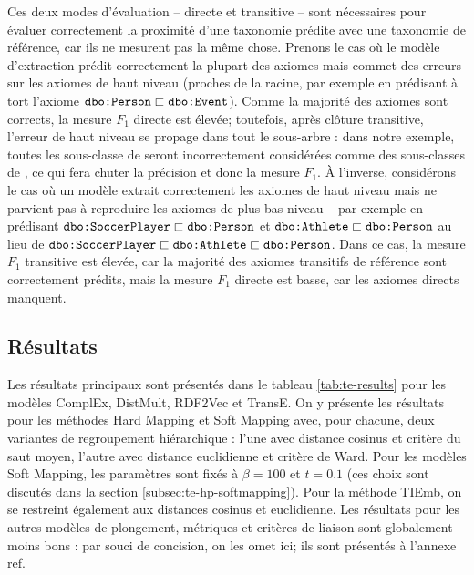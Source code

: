 Ces deux modes d'évaluation – directe et transitive – sont nécessaires pour évaluer correctement la proximité d'une taxonomie prédite avec une taxonomie de référence, car ils ne mesurent pas la même chose. Prenons le cas où le modèle d'extraction prédit correctement la plupart des axiomes mais commet des erreurs sur les axiomes de haut niveau (proches de la racine, par exemple en prédisant à tort l'axiome $\texttt{dbo:Person} \sqsubset \texttt{dbo:Event}$). Comme la majorité des axiomes sont corrects, la mesure $F_1$ directe est élevée; toutefois, après clôture transitive, l'erreur de haut niveau se propage dans tout le sous-arbre : dans notre exemple, toutes les sous-classe de  seront incorrectement considérées comme des sous-classes de , ce qui fera chuter la précision et donc la mesure $F_1$. À l'inverse, considérons le cas où un modèle extrait correctement les axiomes de haut niveau mais ne parvient pas à reproduire les axiomes de plus bas niveau – par exemple en prédisant $\texttt{dbo:SoccerPlayer} \sqsubset \texttt{dbo:Person}$ et $\texttt{dbo:Athlete} \sqsubset \texttt{dbo:Person}$ au lieu de $\texttt{dbo:SoccerPlayer} \sqsubset \texttt{dbo:Athlete} \sqsubset \texttt{dbo:Person}$. Dans ce cas, la mesure $F_1$ transitive est élevée, car la majorité des axiomes transitifs de référence sont correctement prédits, mais la mesure $F_1$ directe est basse, car les axiomes directs manquent. %


\subsection{Résultats}
\label{subsec:te-results}


Les résultats principaux sont présentés dans le tableau \ref{tab:te-results} pour les modèles ComplEx, DistMult, RDF2Vec et TransE. On y présente les résultats pour les méthodes Hard Mapping et Soft Mapping avec, pour chacune, deux variantes de regroupement hiérarchique : l'une avec distance cosinus et critère du saut moyen, l'autre avec distance euclidienne et critère de Ward. Pour les modèles Soft Mapping, les paramètres sont fixés à $\beta = 100$ et $t=0.1$ (ces choix sont discutés dans la section \ref{subsec:te-hp-softmapping}). Pour la méthode TIEmb, on se restreint également aux distances cosinus et euclidienne. 
Les résultats pour les autres modèles de plongement, métriques et critères de liaison sont globalement moins bons : par souci de concision, on les omet ici; ils sont présentés à l'annexe ref.

